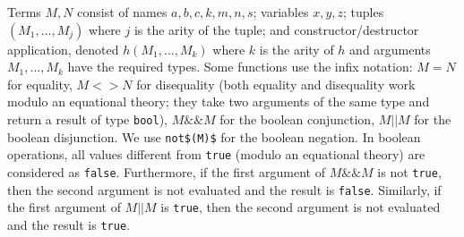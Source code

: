 \documentclass{book}
\begin{document}
Terms $M,N$ consist of names $a,b,c,k,m,n,s$; variables $x,y,z$;
tuples $(M_1,\ldots,M_j)$ where $j$ is the arity of the tuple; and
constructor/destructor application, denoted $h(M_1,\ldots,M_k)$ where $k$ is the arity of $h$
and arguments $M_1,\ldots,M_k$ have the required types. Some functions
use the infix notation: $M = N$ for equality,
$M \mathrel{<>} N$ for disequality
(both equality and disequality work modulo an equational theory; they take two arguments of the same type and return a result of type \lstinline!bool!),
$M \mathrel{\&\&} M$ for the boolean conjunction, $M \mathrel{||} M$  for the
boolean disjunction. We use \lstinline!not$(M)$! for the boolean negation.
In boolean operations, all values different from \lstinline!true! (modulo
an equational theory) are considered as \lstinline!false!.
Furthermore, if the first argument of $M \mathrel{\&\&} M$ is not \lstinline!true!,
then the second argument is not evaluated and the result is \lstinline!false!.
Similarly, if the first argument of $M \mathrel{||} M$ is \lstinline!true!,
then the second argument is not evaluated and the result is \lstinline!true!.
\end{document}
